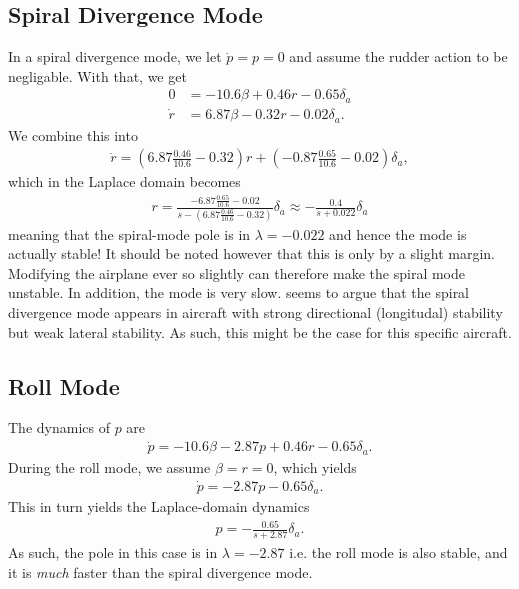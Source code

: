 \subsection{Spiral Divergence Mode}
In a spiral divergence mode, we let $\dot p = p = 0$ and assume the rudder action to be negligable. With that, we get
\begin{align}
0 &= -10.6 \beta + 0.46 r - 0.65 \delta_a \\
\dot r &= 6.87 \beta - 0.32 r - 0.02 \delta_a.
\end{align}
We combine this into
\begin{equation}\begin{aligned}
\dot r = \left(6.87 \frac{0.46}{10.6} - 0.32 \right) r
+ \left( -0.87 \frac{0.65}{10.6} - 0.02 \right) \delta_a,
\end{aligned}\end{equation}
which in the Laplace domain becomes
\begin{equation}\begin{aligned}
r = \frac{-6.87 \frac{0.65}{10.6} - 0.02}{s - (6.87 \frac{0.46}{10.6} -0.32)} \delta_a
\approx -\frac{0.4}{s + 0.022} \delta_a
\end{aligned}\end{equation}
meaning that the spiral-mode pole is in $\lambda = -0.022$ and hence the mode is actually stable! It should be noted however that this is only by a slight margin. Modifying the airplane ever so slightly can therefore make the spiral mode unstable. In addition, the mode is very slow. \cite{nasa} seems to argue that the spiral divergence mode appears in aircraft with strong directional (longitudal) stability but weak lateral stability. As such, this might be the case for this specific aircraft.

\subsection{Roll Mode}
The dynamics of $p$ are
\begin{equation}\begin{aligned}
\dot p = -10.6 \beta - 2.87 p + 0.46 r - 0.65 \delta_a.
\end{aligned}\end{equation}
During the roll mode, we assume $\beta = r = 0$, which yields
\begin{equation}\begin{aligned}
\dot p = -2.87 p - 0.65 \delta_a.
\end{aligned}\end{equation}
This in turn yields the Laplace-domain dynamics
\begin{equation}\begin{aligned}
p = - \frac{0.65}{s + 2.87} \delta_a.
\end{aligned}\end{equation}
As such, the pole in this case is in $\lambda = -2.87$ i.e. the roll mode is also stable, and it is \textit{much} faster than the spiral divergence mode.

